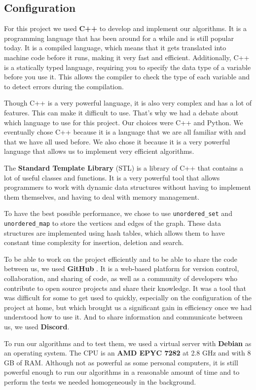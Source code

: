 \subsection{Configuration}

For this project we used \textbf{C++} to develop and implement our algorithms. 
It is a programming language that has been around for a while and is still popular today. 
It is a compiled language, which means that it gets translated into machine code before it runs, making it very fast and efficient. 
Additionally, C++ is a statically typed language, requiring you to specify the data type of a variable before you use it. 
This allows the compiler 
to check the type of each variable and to detect errors during the compilation. \bigskip

Though C++ is a very powerful language, it is also very complex and has a lot of
features. This can make it difficult to use. That's why we had a debate about
which language to use for this project. Our choices were C++ and Python. We
eventually chose C++ because it is a language that we are all familiar with and
that we have all used before. We also chose it because it is a very powerful
language that allows us to implement very efficient algorithms.\bigskip

The \textbf{Standard Template Library} (STL) is a library of C++ that contains 
a lot of useful classes and functions. It is a very powerful tool that allows 
programmers to work with dynamic data structures without having to implement 
them themselves, and having to deal with memory management. \bigskip

To have the best possible performance, we chose to use \texttt{unordered\_set}
and \texttt{unordered\_map} to store the vertices and edges of the graph. These
data structures are implemented using hash tables, which allows them to have
constant time complexity for insertion, deletion and search. \bigskip

To be able to work on the project efficiently and to be able to share the code
between us, we used \textbf{GitHub}\footnotemark 
{}.
It is a web-based platform for version control, collaboration, and sharing of
code, as well as a community of developers who contribute to open source projects
and share their knowledge. It was a tool that was difficult for some to get used
to quickly, especially on the configuration of the project at home, but which
brought us a significant gain in efficiency once we had understood how to use it.
And to share information and communicate between us, we used \textbf{Discord}.
\bigskip

To run our algorithms and to test them, we used a virtual server with \textbf{Debian}
as an operating system. The CPU is an \textbf{AMD EPYC 7282} at 2.8 GHz and with
8 GB of RAM. Although not as powerful as some personal computers, it is still
powerful enough to run our algorithms in a reasonable amount of time and to
perform the tests we needed homogeneously in the background.